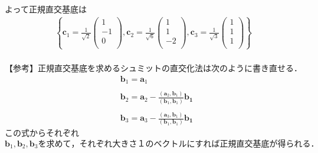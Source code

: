\documentclass[dvipdfmx,uplatex,11pt]{jsarticle}
\theoremstyle{definition}
\begin{document}
よって正規直交基底は
\begin{eqnarray*}
\left\{
\bm{c}_1=\frac{1}{\sqrt{2}}
\begin{pmatrix}
1 \\
-1 \\
0 \\
\end{pmatrix}
,
\bm{c}_2 =\frac{1}{\sqrt{6}}
\begin{pmatrix}
1 \\
1 \\
-2 \\
\end{pmatrix}
,
\bm{c}_3 =\frac{1}{\sqrt{3}}
\begin{pmatrix}
1 \\
1 \\
1 \\
\end{pmatrix}
\right\}
\end{eqnarray*}
\dotfill \\
【参考】正規直交基底を求めるシュミットの直交化法は次のように書き直せる．
\begin{eqnarray*}
& \bm{b}_1 =\bm{a}_1 \\ \\
& \bm{b}_2 =\bm{a}_2-\frac{(\bm{a}_2 ,\bm{b}_1)}{(\bm{b}_1 ,\bm{b}_1 )}\bm{b_1} \\ \\
& \bm{b}_3 =\bm{a}_3-\frac{(\bm{a}_3 ,\bm{b}_1)}{(\bm{b}_1 ,\bm{b}_1 )}\bm{b_1} 
\end{eqnarray*}
この式からそれぞれ$\bm{b}_1, \bm{b}_2, \bm{b}_3 を求めて，それぞれ大きさ１のベクトルにすれば正規直交基底が得られる．$
%
%
%
\newpage
%
%
%
\end{document}
